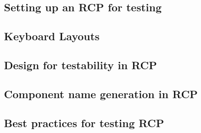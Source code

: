 


\subsection{Setting up an RCP \gdaut{} for testing}


\subsection{Keyboard Layouts}


\subsection{Design for testability in RCP}


\subsection{Component name generation in RCP}
\label{RCPgenerate}


\subsection{Best practices for testing RCP \gdauts{}}

